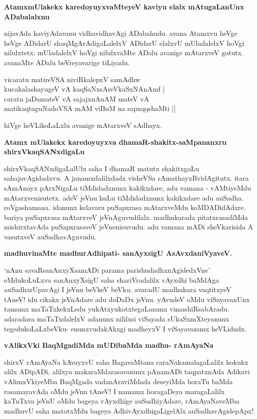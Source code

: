 {\bigskip
\noindent
{\large\bf AtamxmUlakekx karedoyuyxvaMteyeV kaviyu elalx mAtugaLanUnx ADabalalxnu}}\label{page237}
\medskip

\noindent
nijavAda kaviyAdavanu vidhavidhavAgi ADabahudu. avana Atamxvu heVge heVge ADidarU shaqMgArAdigaLalelxV ADidarU elalxvU mUladalelxV hoVgi nilulxtetx. mUladalelxV hoVgi nilulxvaMte ADalu avanige mAtarxveV gotutx. avanaMte ADalu beVreyavarige tiLiyadu.

\smallskip
\begin{shloka}
vicaratu matireVSA niviRkalepxV samAdhw \\\label{237}
kucakalashayugeV vA kaqSaNxsAreVkaSxNAnAmf |\\
caratu jaDamateV vA sajajxnAnAM mateV vA \\
matikaqtaguNadoVSA mAM viBuM na sapxqqshaMti ||
\end{shloka}

\noindent
hiVge heVLikoLaLxlu avanige mAtarxveV sAdhayx.

{\bigskip
\noindent
{\large\bf Atamx mUlakekx karedoyuyxva dhamaR-shakitx-saMpananxru shirxVkaqSANxdigaLu}}\label{page237a}
\medskip

\noindent
shirxVkaqSANxdigaLalUlx saha I dhamaR matutx shakitxgaLu sahajavAgidadxvu. A janamxdalilxdadx visheVSa sAmathayxRvidAgitutx. itara sAmAnayx pArxNigaLu tiMdidadxnunx kakikxdare, adu vamana - vAMtiyeMdu mAtarxvenisutetx. adeV jeVnu huLu tiMdidadxnunx kakikxdare adu auSadha. roVgashamana. idanunx kelavaru puSapxrasa mAtarxveMdu koMDADidAdxre. bariya puSapxrasa mAtarxveV jeVnAguvudilalx. madhukarada pitatxrasadiMda mishirxtavAda puSapxrasaveV jeVnenisuvudu. adu vamana mADi sheVkarisida A vasutxveV auSadhavAguvudu.

{\bigskip
\noindent
{\large\bf madhuvinaMte madhurAdhipati- sanAyxsigU AsAvxdaniVyaveV.}}\label{page238}
\medskip

\noindent
`nAnu savaRsanAnxyXsamADi parama parishudadhxnAgidedxVne' eMdukoLuLxva sanAnxyXsigU saha shariVradalilx vAyxdhi baMdAga auSadharUpavAgi I jeVnu beVkeV beVku. avaradU madhukara vaqtitxyeV tAneV! idu cikakx jeVnAdare adu doDaDx jeVnu. yAvudeV oMdu viSayavanUnx tamamx maTaTxkekxLedu yukAtxyukatxtegaLanunx vimashiRsabAradu. adaradara maTaTxdalelxV adanunx nililxsi viSayada sUkaSxmXteyanunx tegedukoLaLxbeVku- enunxvudakAkxgi madheyxV I viSayavanunx heVLidudx.

\newpage
{\noindent
{\large\bf vAlikxVki BaqMgadiMda mUDibaMda madhu- rAmAyaNa}}\label{page238a}
\medskip

\noindent
shirxV rAmAyaNa kAvayxvU saha BagavaMtana caraNakamalagaLalilx hokukx alilx ADipADi, alilxya makaraMdarasavanunx pAnamADi taqpatxnAda Adikavi vAlimxVkiyeMba BaqMgada vadanAraviMdada deseyiMda horaTu baMda rasamayavAda oMdu jeVnu tAneV! I namamx horagaDeya maragaLalilx kaTuTxva jeVnU oMdu bageya vAyxdhige auSadhiyAdare, rAmAyaNaveMba madhuvU saha matotxMdu bageya AdhivAyxdhigaLigelAlx auSadhavAgidepApx!

